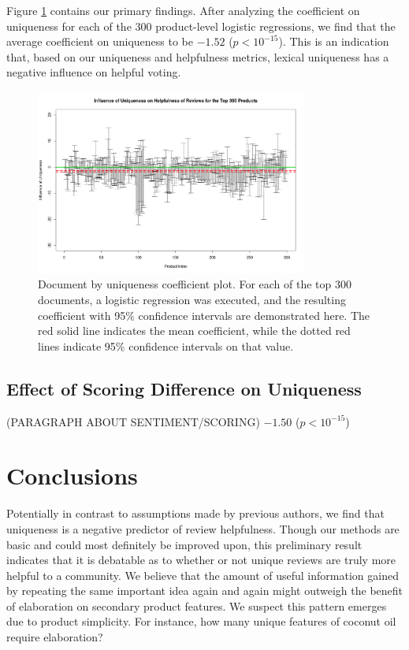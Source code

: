 \documentclass[10pt]{article}
\begin{document}
Figure \ref{fig:result} contains our primary findings. After analyzing the coefficient on uniqueness for each of the 300 product-level logistic regressions, we find that the average coefficient on uniqueness to be $-1.52$ ($p < 10^{-15}$). This is an indication that, based on our uniqueness and helpfulness metrics, lexical uniqueness has a negative influence on helpful voting. 

\begin{figure}[h!]
  \centering
  \includegraphics[width=0.8\textwidth]{influence.png}
  \caption{Document by uniqueness coefficient plot. For each of the top 300 documents, a logistic regression was executed, and the resulting coefficient with 95\% confidence intervals are demonstrated here. The red solid line indicates the mean coefficient, while the dotted red lines indicate 95\% confidence intervals on that value.}
  \label{fig:result}
\end{figure}

\subsection{Effect of Scoring Difference on Uniqueness}





(PARAGRAPH ABOUT SENTIMENT/SCORING) $-1.50$ ($p < 10^{-15}$)

\section*{Conclusions}
Potentially in contrast to assumptions made by previous authors, we find that uniqueness is a negative predictor of review helpfulness. Though our methods are basic and could most definitely be improved upon, this preliminary result indicates that it is debatable as to whether or not unique reviews are truly more helpful to a community. We believe that the amount of useful information gained by repeating the same important idea again and again might outweigh the benefit of elaboration on secondary product features. We suspect this pattern emerges due to product simplicity. For instance, how many unique features of coconut oil require elaboration?
\end{document}
